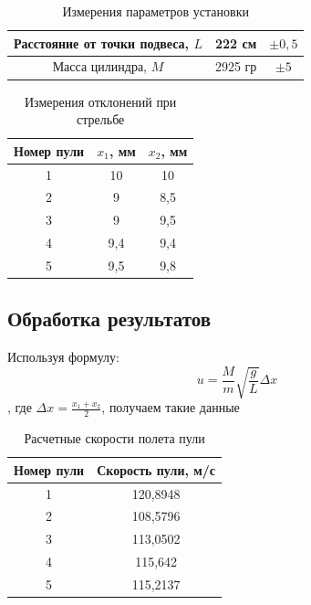 \documentclass[a4paper]{article}
\begin{document}
\begin{table}[h!]
\begin{center}
\begin{tabular}{|c|c|c|}
\hline
Расстояние от точки подвеса, $L$ & 222 см  & $\pm 0,5$ \\ \hline
Масса цилиндра, $M$              & 2925 гр & $\pm 5$   \\ \hline
\end{tabular}
\caption{Измерения параметров установки}
\end{center}
\end{table}

\begin{table}[h!]
\begin{center}
\begin{tabular}{|c|c|c|}
\hline
Номер пули & $x_{1}$, мм & $x_{2}$, мм \\ \hline
1          & 10      & 10      \\ \hline
2          & 9       & 8,5     \\ \hline
3          & 9       & 9,5     \\ \hline
4          & 9,4     & 9,4     \\ \hline
5          & 9,5     & 9,8     \\ \hline
\end{tabular}
\caption{Измерения отклонений при стрельбе}
\end{center}
\end{table}

\subsection{Обработка результатов}

Используя формулу:
\begin{equation} 
	 u=\frac{M}{m} \sqrt{\frac{g}{L}} \Delta x
\end{equation}
, где $\Delta x = \frac{x_{1}+x_{2}}{2}$, получаем такие данные

\begin{table}[h!]
\begin{center}
\begin{tabular}{|c|c|}
\hline
Номер пули & Скорость пули, м/с \\ \hline
1          & 120,8948           \\ \hline
2          & 108,5796           \\ \hline
3          & 113,0502           \\ \hline
4          & 115,642            \\ \hline
5          & 115,2137           \\ \hline
\end{tabular}
\caption{Расчетные скорости полета пули}
\end{center}
\end{table}
\end{document}
